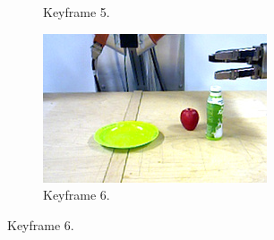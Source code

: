 \begin{figure}
\begin{subfigure}[t]{0.475\textwidth}
    \caption{Keyframe 5.}
    \label{fig:sec_usingaffordanceforplanning_results_scenario3_5}
  \end{subfigure}
  \hfill
  \begin{subfigure}[t]{0.475\textwidth}
    \includegraphics[width=\textwidth]{./figures/sec/planning/exec3/frame2222.jpg}
    \caption{Keyframe 6.}
    \label{fig:sec_usingaffordanceforplanning_results_scenario3_6}
  \end{subfigure}
\end{figure}

